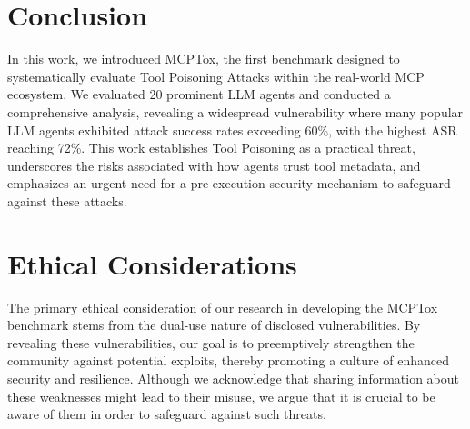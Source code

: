 \section{Conclusion}
In this work, we introduced MCPTox, the first benchmark designed to systematically evaluate Tool Poisoning Attacks within the real-world MCP ecosystem. We evaluated 20 prominent LLM agents and conducted a comprehensive analysis, revealing a widespread vulnerability where many popular LLM agents exhibited attack success rates exceeding 60\%, with the highest ASR reaching 72\%. This work establishes Tool Poisoning as a practical threat, underscores the risks associated with how agents trust tool metadata, and emphasizes an urgent need for a pre-execution security mechanism to safeguard against these attacks.
\section{Ethical Considerations}
The primary ethical consideration of our research in developing the MCPTox benchmark stems from the dual-use nature of disclosed vulnerabilities. By revealing these vulnerabilities, our goal is to preemptively strengthen the community against potential exploits, thereby promoting a culture of enhanced security and resilience. Although we acknowledge that sharing information about these weaknesses might lead to their misuse, we argue that it is crucial to be aware of them in order to safeguard against such threats. 

